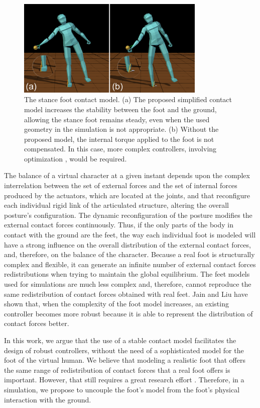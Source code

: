 \documentclass[tog]{acmsiggraph}
\begin{document}
\begin{figure}[thbp]
\centering
\includegraphics[width=9cm]{images/PefirmeXPedeslizando.eps}
\caption{The stance foot contact model. (a) The proposed simplified contact model increases the stability between the foot and the ground, 
         allowing the stance foot remains steady, even when the used geometry in the simulation is not appropriate.
         (b) Without the proposed model, the internal torque applied to the foot is not compensated. In this case, more complex controllers, involving optimization
         \protect\cite{bib:Macchietto09,bib:Geijtenbeek12}, would be required.}
\label{fig:PefirmeXPedeslizando}
\end{figure}



The balance of a virtual character at a given instant depends upon the complex interrelation between the set of external forces and the set
of internal forces produced by the actuators, which are located at the joints, and that reconfigure each individual rigid link of the articulated
structure, altering the overall posture’s configuration. The dynamic reconfiguration of the posture modifies the external contact forces 
continuously. Thus, if the only parts of the body in contact with the ground are the feet, the way each individual foot is modeled will 
have a strong influence on the overall distribution of the external contact forces, and, therefore, on the balance of the character. Because a 
real foot is structurally complex and flexible, it can generate an infinite number of external contact forces redistributions when trying to 
maintain the global equilibrium. The feet models used for simulations are much less complex and, therefore, cannot reproduce the same 
redistribution of contact forces obtained with real feet. Jain and Liu  have shown that, when the complexity of the foot model
increases, an existing controller becomes more robust because it is able to represent the distribution of contact forces better.


In this work, we argue that the use of a stable contact model facilitates the design of robust controllers, without the need of a sophisticated
model for the foot of the virtual human. We believe that modeling a realistic foot that offers the same range of redistribution of contact forces
that a real foot offers is important. However, that still requires a great research effort \cite{bib:Jain11}. Therefore, in a simulation, we 
propose to uncouple the foot’s model from the foot’s physical interaction with the ground.
\end{document}
